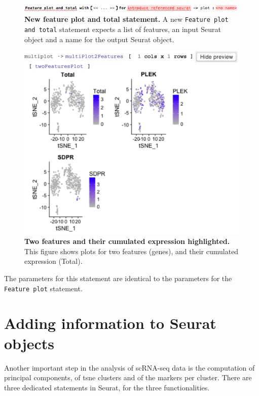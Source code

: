 \begin{figure}[h!tbp]
  \centering
    \includegraphics[width=\figWidthWide]{figures/FeaturesPlotTotal.png}
    \caption[New feature plot and total statement.]{\textbf{New feature plot and total statement.} A new
    \texttt{Feature plot and total} statement expects a list of features, an input Seurat object
    and a name for the output Seurat object.}
\label{fig:FeaturesPlotTotal}
\end{figure}

\begin{figure}
  \centering
    \includegraphics[width=\figWidthNarrow]{figures/TwoFeaturesPlot.pdf}
    \caption[Two features and their cumulated expression highlighted.]{\textbf{Two features
    and their cumulated expression highlighted.} This figure shows plots for two features (genes),
    and their cumulated expression (Total).}
\label{fig:TwoFeaturesPlot}
\end{figure}

The parameters for this statement are identical to the parameters for the \texttt{Feature plot}
statement.

\section{Adding information to Seurat objects}
Another important step in the analysis of scRNA-seq data is the computation of principal
components, of tsne clusters and of the markers per cluster. There are three dedicated
statements in Seurat, for the three functionalities.

